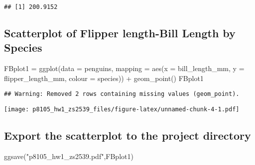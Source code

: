 \documentclass[
]{article}
\newenvironment{Shaded}{\begin{snugshade}}{\end{snugshade}}
\newcommand{\AttributeTok}[1]{\textcolor[rgb]{0.77,0.63,0.00}{#1}}
\newcommand{\FunctionTok}[1]{\textcolor[rgb]{0.00,0.00,0.00}{#1}}
\newcommand{\NormalTok}[1]{#1}
\newcommand{\OtherTok}[1]{\textcolor[rgb]{0.56,0.35,0.01}{#1}}
\newcommand{\SpecialCharTok}[1]{\textcolor[rgb]{0.00,0.00,0.00}{#1}}
\newcommand{\StringTok}[1]{\textcolor[rgb]{0.31,0.60,0.02}{#1}}
\begin{document}
\begin{Shaded}
\end{Shaded}

\begin{verbatim}
## [1] 200.9152
\end{verbatim}

\hypertarget{scatterplot-of-flipper-length-bill-length-by-species}{%
\subsection{Scatterplot of Flipper length-Bill Length by
Species}\label{scatterplot-of-flipper-length-bill-length-by-species}}

\begin{Shaded}
\begin{Highlighting}[]
\NormalTok{FBplot1 }\OtherTok{=} \FunctionTok{ggplot}\NormalTok{(}\AttributeTok{data =}\NormalTok{ penguins, }\AttributeTok{mapping =} \FunctionTok{aes}\NormalTok{(}\AttributeTok{x =}\NormalTok{ bill\_length\_mm, }\AttributeTok{y =}\NormalTok{ flipper\_length\_mm, }\AttributeTok{colour =}\NormalTok{ species)) }\SpecialCharTok{+} \FunctionTok{geom\_point}\NormalTok{()}
\NormalTok{FBplot1}
\end{Highlighting}
\end{Shaded}

\begin{verbatim}
## Warning: Removed 2 rows containing missing values (geom_point).
\end{verbatim}

\texttt{[image: p8105\_hw1\_zs2539\_files/figure-latex/unnamed-chunk-4-1.pdf]}

\hypertarget{export-the-scatterplot-to-the-project-directory}{%
\subsection{Export the scatterplot to the project
directory}\label{export-the-scatterplot-to-the-project-directory}}

\begin{Shaded}
\begin{Highlighting}[]
\FunctionTok{ggsave}\NormalTok{(}\StringTok{"p8105\_hw1\_zs2539.pdf"}\NormalTok{,FBplot1)}
\end{Highlighting}
\end{Shaded}
\end{document}

